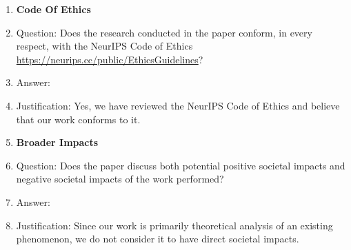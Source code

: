 \begin{enumerate}
\item {\bf Code Of Ethics}
    \item[] Question: Does the research conducted in the paper conform, in every respect, with the NeurIPS Code of Ethics \url{https://neurips.cc/public/EthicsGuidelines}?
    \item[] Answer: \answerYes
    \item[] Justification: Yes, we have reviewed the NeurIPS Code of Ethics and believe that our work conforms to it.
\item {\bf Broader Impacts}
    \item[] Question: Does the paper discuss both potential positive societal impacts and negative societal impacts of the work performed?
    \item[] Answer: \answerNA
    \item[] Justification: Since our work is primarily theoretical analysis of an existing phenomenon, we do not consider it to have 
      direct societal impacts. 
    

\end{enumerate}
